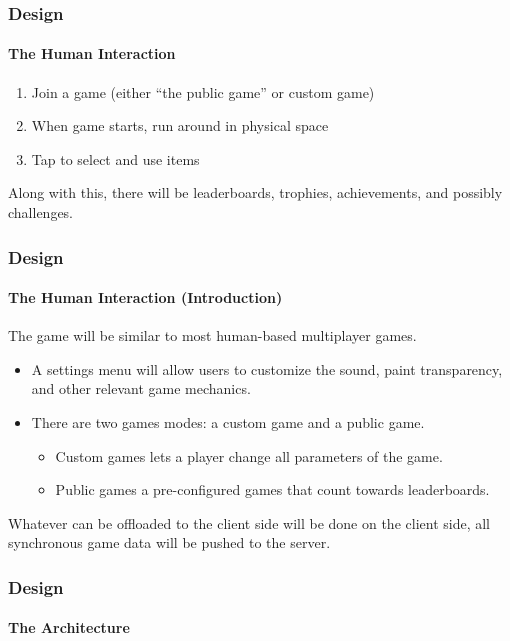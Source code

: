 \documentclass[xclolor=dvipsnames]{beamer}            %
\begin{document}
\begin{darkframes}
\begin{frame}
    \end{frame}


    \begin{frame}
        \frametitle{Design}
        \framesubtitle{The Human Interaction}

        \begin{enumerate}
            \item Join a game (either ``the public game'' or custom game)
            \item When game starts, run around in physical space
            \item Tap to select and use items
        \end{enumerate}

        Along with this, there will be leaderboards, trophies, achievements, and possibly challenges.

    \end{frame}


    \begin{frame}
        \frametitle{Design}
        \framesubtitle{The Human Interaction (Introduction)}

        The game will be similar to most human-based multiplayer games.

        \begin{itemize}
            \item A settings menu will allow users to customize the sound, paint transparency, and other relevant game mechanics.
            \item There are two games modes: a custom game and a public game.
                \begin{itemize}
                    \item Custom games lets a player change all parameters of the game.
                    \item Public games a pre-configured games that count towards leaderboards.
                \end{itemize}
        \end{itemize}

        Whatever can be offloaded to the client side will be done on the client side, all synchronous game data will be pushed to the server.
    \end{frame}


    \begin{frame}
        \frametitle{Design}
        \framesubtitle{The Architecture}


\end{frame}
\end{darkframes}
\end{document}
